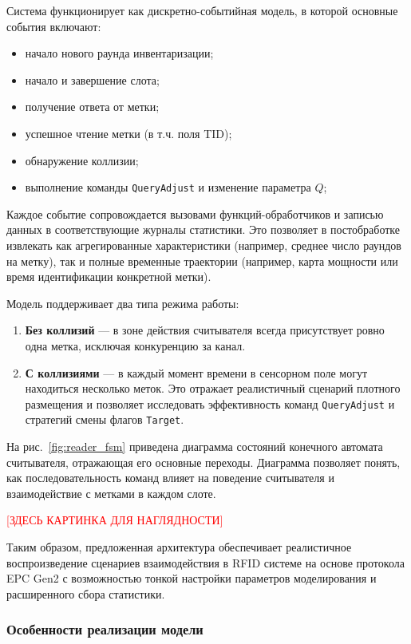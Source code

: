 \documentclass[12pt]{article}
\theoremstyle{definition}
\begin{document}
Система функционирует как дискретно-событийная модель, в которой основные события включают:
\begin{itemize}
    \item начало нового раунда инвентаризации;
    \item начало и завершение слота;
    \item получение ответа от метки;
    \item успешное чтение метки (в т.ч. поля TID);
    \item обнаружение коллизии;
    \item выполнение команды \texttt{QueryAdjust} и изменение параметра $Q$;
\end{itemize}

Каждое событие сопровождается вызовами функций-обработчиков и записью данных в соответствующие журналы статистики. Это позволяет в постобработке извлекать как агрегированные характеристики (например, среднее число раундов на метку), так и полные временные траектории (например, карта мощности или время идентификации конкретной метки).

Модель поддерживает два типа режима работы:
\begin{enumerate}
    \item \textbf{Без коллизий} --- в зоне действия считывателя всегда присутствует ровно одна метка, исключая конкуренцию за канал.
    
    \item \textbf{С коллизиями} --- в каждый момент времени в сенсорном поле могут находиться несколько меток. Это отражает реалистичный сценарий плотного размещения и позволяет исследовать эффективность команд \texttt{QueryAdjust} и стратегий смены флагов \texttt{Target}.
\end{enumerate}

На рис.~\ref{fig:reader_fsm} приведена диаграмма состояний конечного автомата считывателя, отражающая его основные переходы. Диаграмма позволяет понять, как последовательность команд влияет на поведение считывателя и взаимодействие с метками в каждом слоте.

\textcolor{red}{[ЗДЕСЬ КАРТИНКА ДЛЯ НАГЛЯДНОСТИ]}

Таким образом, предложенная архитектура обеспечивает реалистичное воспроизведение сценариев взаимодействия в RFID системе на основе протокола EPC Gen2 с возможностью тонкой настройки параметров моделирования и расширенного сбора статистики.

\subsubsection{Особенности реализации модели}
\end{document}
